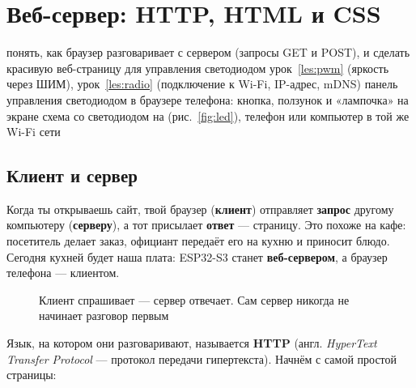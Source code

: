 \section{Веб-сервер: HTTP, HTML и CSS}
\label{les:web}
\lessonintro
  {понять, как браузер разговаривает с сервером (запросы GET и POST), и сделать красивую веб-страницу для управления светодиодом}
  {урок~\ref{les:pwm} (яркость через ШИМ), урок~\ref{les:radio} (подключение к Wi-Fi, IP-адрес, mDNS)}
  {панель управления светодиодом в браузере телефона: кнопка, ползунок и «лампочка» на экране}
  {схема со светодиодом на  (рис.~\ref{fig:led}), телефон или компьютер в той же Wi-Fi сети}

\subsection{Клиент и сервер}

Когда ты открываешь сайт, твой браузер (\textbf{клиент}) отправляет \textbf{запрос} другому компьютеру
(\textbf{серверу}), а тот присылает \textbf{ответ} --- страницу. Это похоже на кафе: посетитель делает
заказ, официант передаёт его на кухню и приносит блюдо. Сегодня кухней будет наша плата: ESP32-S3
станет \textbf{веб-сервером}, а браузер телефона --- клиентом.

\begin{figure}[H]
\centering
{}
\caption{Клиент спрашивает --- сервер отвечает. Сам сервер никогда не начинает разговор первым}
\end{figure}

Язык, на котором они разговаривают, называется \textbf{HTTP} (англ. \emph{HyperText Transfer Protocol} ---
протокол передачи гипертекста). Начнём с самой простой страницы:

